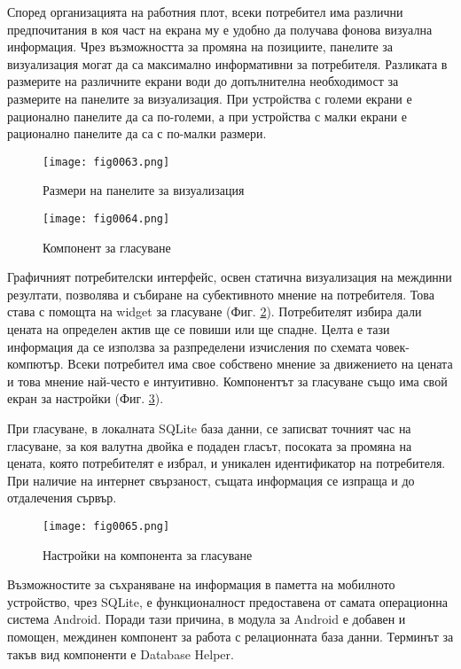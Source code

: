 Според организацията на работния плот, всеки потребител има различни предпочитания в коя част на екрана му е удобно да получава фонова визуална информация. Чрез възможността за промяна на позициите, панелите за визуализация могат да са максимално информативни за потребителя. Разликата в размерите на различните екрани води до допълнителна необходимост за размерите на панелите за визуализация. При устройства с големи екрани е рационално панелите да са по-големи, а при устройства с малки екрани е рационално панелите да са с по-малки размери. 

\begin{figure}[H]
  \centering
  \texttt{[image: fig0063.png]}
  \caption{Размери на панелите за визуализация}
\label{fig0063}
\end{figure}

\begin{figure}[H]
  \centering
  \texttt{[image: fig0064.png]}
  \caption{Компонент за гласуване}
\label{fig0064}
\end{figure}

Графичният потребителски интерфейс, освен статична визуализация на междинни резултати, позволява и събиране на субективното мнение на потребителя. Това става с помощта на widget за гласуване (Фиг. \ref{fig0064}). Потребителят избира дали цената на определен актив ще се повиши или ще спадне. Целта е тази информация да се използва за разпределени изчисления по схемата човек-компютър. Всеки потребител има свое собствено мнение за движението на цената и това мнение най-често е интуитивно.  Компонентът за гласуване също има свой екран за настройки (Фиг. \ref{fig0065}).

При гласуване, в локалната SQLite база данни, се записват точният час на гласуване, за коя валутна двойка е подаден гласът, посоката за промяна на цената, която потребителят е избрал, и уникален идентификатор на потребителя. При наличие на интернет свързаност, същата информация се изпраща и до отдалечения сървър. 

\begin{figure}[H]
  \centering
  \texttt{[image: fig0065.png]}
  \caption{Настройки на компонента за гласуване}
\label{fig0065}
\end{figure}

Възможностите за съхраняване на информация в паметта на мобилното устройство, чрез SQLite, е функционалност предоставена от самата операционна система Android. Поради тази причина, в модула за Android е добавен и помощен, междинен компонент за работа с релационната база данни. Терминът за такъв вид компоненти е Database Helper.

